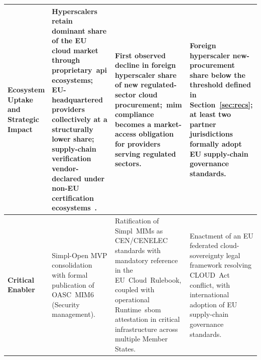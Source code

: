 \documentclass{ieeeaccess}
\begin{document}
\begin{table}[ht!]
\begin{tabularx}{\textwidth}{@{}>{\bfseries}p{} X X X@{}}
\addlinespace[2pt]
Ecosystem Uptake and Strategic Impact &
Hyperscalers retain dominant share of the EU cloud market through proprietary~\gls{api} ecosystems; EU-headquartered providers collectively at a structurally lower share; supply-chain verification vendor-declared under non-EU certification ecosystems~\cite{synergy2025}. &
First observed decline in foreign hyperscaler share of new regulated-sector cloud procurement;~\gls{mim} compliance becomes a market-access obligation for providers serving regulated sectors. &
Foreign hyperscaler new-procurement share below the threshold defined in Section~\ref{sec:recs}; at least two partner jurisdictions formally adopt EU supply-chain governance standards. \\
\midrule
\textbf{Critical Enabler} &
Simpl-Open MVP consolidation with formal publication of OASC~MIM6 (Security management). &
Ratification of Simpl~MIMs as CEN/CENELEC standards with mandatory reference in the EU~Cloud~Rulebook, coupled with operational Runtime~\acrshort{sbom} attestation in critical infrastructure across multiple Member States. &
Enactment of an EU federated cloud-sovereignty legal framework resolving CLOUD~Act conflict, with international adoption of EU supply-chain governance standards. \\
\bottomrule
\end{tabularx}
\end{table}
\end{document}
